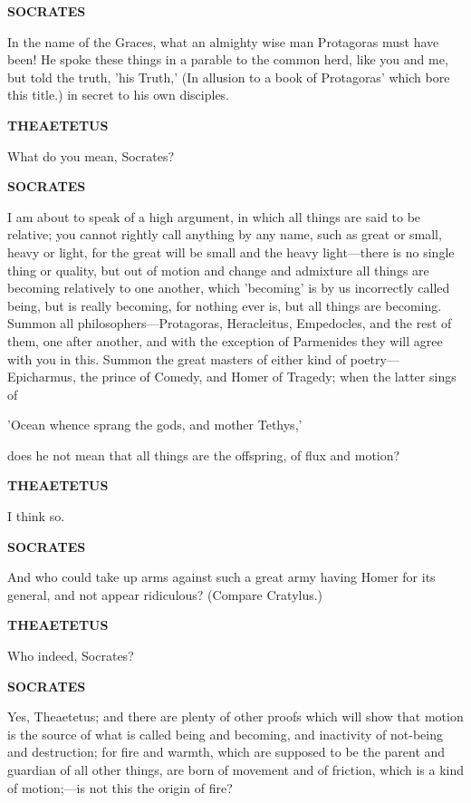 \documentclass[11pt,letter]{article}
\begin{document}
\par \textbf{SOCRATES}
\par   In the name of the Graces, what an almighty wise man Protagoras must have been! He spoke these things in a parable to the common herd, like you and me, but told the truth, 'his Truth,' (In allusion to a book of Protagoras' which bore this title.) in secret to his own disciples.

\par \textbf{THEAETETUS}
\par   What do you mean, Socrates?

\par \textbf{SOCRATES}
\par   I am about to speak of a high argument, in which all things are said to be relative; you cannot rightly call anything by any name, such as great or small, heavy or light, for the great will be small and the heavy light—there is no single thing or quality, but out of motion and change and admixture all things are becoming relatively to one another, which 'becoming' is by us incorrectly called being, but is really becoming, for nothing ever is, but all things are becoming. Summon all philosophers—Protagoras, Heracleitus, Empedocles, and the rest of them, one after another, and with the exception of Parmenides they will agree with you in this. Summon the great masters of either kind of poetry—Epicharmus, the prince of Comedy, and Homer of Tragedy; when the latter sings of

\par  'Ocean whence sprang the gods, and mother Tethys,'

\par  does he not mean that all things are the offspring, of flux and motion?

\par \textbf{THEAETETUS}
\par   I think so.

\par \textbf{SOCRATES}
\par   And who could take up arms against such a great army having Homer for its general, and not appear ridiculous? (Compare Cratylus.)

\par \textbf{THEAETETUS}
\par   Who indeed, Socrates?

\par \textbf{SOCRATES}
\par   Yes, Theaetetus; and there are plenty of other proofs which will show that motion is the source of what is called being and becoming, and inactivity of not-being and destruction; for fire and warmth, which are supposed to be the parent and guardian of all other things, are born of movement and of friction, which is a kind of motion;—is not this the origin of fire?
\end{document}
